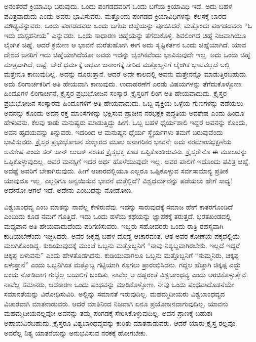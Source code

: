 ಅನಂತರವೆ ಕ್ರಿಯಾವಿಧಿ ಬರುವುದು. ಒಂದು ಪಂಗಡದವರಿಗೆ ಒಂದು ಬಗೆಯ ಕ್ರಿಯಾವಿಧಿ ಇದೆ. ಅದು ಬಹಳ ಪವಿತ್ರವಾದುದು ಎಂದು ಅವರು ಭಾವಿಸುವರು. ಮತ್ತೊಂದು ಪಂಗಡದ ಕ್ರಿಯಾವಿಧಿಗಳನ್ನು ಕೆಲಸಕ್ಕೆ ಬಾರದ ಮೌಢ್ಯವೆನ್ನುವರು. ಒಂದು ಪಂಗಡದವರು ಒಂದು ಬಗೆಯ ಚಿಹ್ನೆಯನ್ನು ಪೂಜಿಸಿದರೆ, ಮತ್ತೊಂದು ಪಂಗಡದವರು “ಓ ಇದು ದುಸ್ಸಹನೀಯ” ಎನ್ನುವರು. ಒಂದು ಸಾಧಾರಣ ಚಿಹ್ನೆಯನ್ನು ತೆಗೆದುಕೊಳ್ಳಿ. ಶಿವಲಿಂಗದ ಚಿಹ್ನೆ ನಿಜವಾಗಿಯೂ ಲೈಂಗಿಕ ಚಿಹ್ನೆ. ಆದರೆ ಕ್ರಮೇಣ ಆ ಭಾವನೆ ಮರೆತುಹೋಗಿ ಈಗ ಅದು ಸೃಷ್ಟಿಕರ್ತನ ಒಂದು ಚಿಹ್ನೆಯಾಗಿದೆ. ಯಾವ ದೇಶದ ಜನರಿಗೆ ಇದು ಚಿಹ್ನೆಯಾಗಿದೆಯೋ ಅವರು ಇದನ್ನು ಲೈಂಗಿಕವೆಂದು ಭಾವಿಸುವುದೇ ಇಲ್ಲ. ಅದು ಒಂದು ಚಿಹ್ನೆ ಮಾತ್ರವಾಗಿದೆ, ಅಷ್ಟೆ. ಬೇರೆ ಧರ್ಮಕ್ಕೆ ಅಥವಾ ಜನಾಂಗಕ್ಕೆ ಸೇರಿದ ಮತ್ತೊಬ್ಬನಿಗೆ ಲೈಂಗಿಕ ಭಾವವಲ್ಲದೆ ಅಲ್ಲಿ ಮತ್ತೇನೂ ಕಾಣುವುದಿಲ್ಲ. ಅದನ್ನು ದೂರುತ್ತಾನೆ. ಆದರೆ ಅದೇ ಕಾಲದಲ್ಲಿ ಅವನು ಮತ್ತೇನನ್ನೊ ಮಾಡುತ್ತಿರಬಹುದು. ಅದು ಲಿಂಗಾರ್ಚಕರಿಗೆ ಅತಿ ಹೇಯವಾಗಿ ಕಾಣುವುದು. ಉದಾಹರಣೆಗೆ ಎರಡು ವಿಷಯಗಳನ್ನು ತೆಗೆದುಕೊಳ್ಳೋಣ: ಹಿಂದೂಗಳ ಲಿಂಗಾರ್ಚನೆ, ಕ್ರೈಸ್ತರ ಪ್ರಭುಭೋಜನ ಸಂಸ್ಕಾರ. ಕ್ರೈಸ್ತರಿಗೆ ಲಿಂಗ ಅತಿ ಹೇಯವಾದುದು. ಕ್ರೈಸ್ತರ ಪ್ರಭುಭೋಜನ ಸಂಸ್ಕಾರವು ಹಿಂದೂಗಳಿಗೆ ಅತಿ ಹೇಯವಾದುದು. ಒಬ್ಬ ವ್ಯಕ್ತಿಯ ಒಳ್ಳೆಯ ಗುಣಗಳನ್ನು ಪಡೆಯಲು ಅವನನ್ನು ಕೊಂದು ಅವನ ರಕ್ತ ಮಾಂಸಗಳನ್ನು ಭಕ್ಷಿಸುವ ಪ್ರಾಚೀನ ನರಭಕ್ಷಕ ಪದ್ಧತಿಯ ಅವಶೇಷ ಎಂದು ಹಿಂದೂ ಹೇಳುವನು. ಕೆಲವು ಕಾಡು ಮನುಷ್ಯರು ಮಾಡುತ್ತಿದ್ದು ಹೀಗೆ. ಒಬ್ಬ ಬಹಳ ಧೈರ್ಯಶಾಲಿ ಇದ್ದರೆ ಅವನನ್ನು ಕೊಂದು, ಅವನ ಹೃದಯವನ್ನು ತಿನ್ನುವರು. ಇದರಿಂದ ಆ ಮನುಷ್ಯನ ಧೈರ್ಯ ಸ್ಥೈರ್ಯಗಳು ತಮಗೆ ಬರುವುವೆಂದು ಭಾವಿಸುವರು. ಕ್ರೈಸ್ತರ ಪ್ರಭುಭೋಜನ ಸಂಸ್ಕಾರದ ಮೂಲ ಅನಾಗರಿಕರ ಭಾವನೆ; ಅದು ನರಮಾಂಸಭಕ್ಷಣೆಯ ಅವಶೇಷ ಎಂದು ಸರ್​ ಜಾನ್​ ಲುಬಕ್​ ನಂತಹ ಕ್ರೈಸ್ತಭಕ್ತ ಕೂಡ ಒಪ್ಪಿಕೊಂಡಿರುವನು. ಕ್ರೈಸ್ತರೇನೊ ಈ ಮೂಲವನ್ನು ಒಪ್ಪಿಕೊಳ್ಳುವುದಿಲ್ಲ. ಅವರ ಮನಸ್ಸಿಗೆ ಇದರ ಅರ್ಥ ಹೊಳೆಯುವುದೇ ಇಲ್ಲ. ಅವರ ಪಾಲಿಗೆ ಇದೊಂದು ಪವಿತ್ರ ಚಿಹ್ನೆ. ಅದಷ್ಟೆ ಅವರಿಗೆ ಬೇಕಾಗಿರುವುದು. ಹೀಗೆ ಆಚಾರದಲ್ಲಿಯೂ ಎಲ್ಲರೂ ಒಪ್ಪಿಕೊಳ್ಳುವ ಸರ್ವಸಾಮಾನ್ಯ ಪ್ರತೀಕ ಯಾವುದೂ ಇಲ್ಲ. ಎಲ್ಲರಿಗೂ ಅನ್ವಯಿಸುವ ಭಾವನೆ ಮತ್ತೆಲ್ಲಿದೆ? ವಿಶ್ವಧರ್ಮವನ್ನು ಪಡೆಯಲು ಹೇಗೆ ಸಾಧ್ಯ! ಅದೇನೋ ಆಗಲೆ ಇದೆ. ಅದೇನು ಎಂಬುದನ್ನು ನೋಡೋಣ.

ವಿಶ್ವಬಾಂಧವ್ಯ ಎಂಬ ಮಾತನ್ನು ನಾವೆಲ್ಲ ಕೇಳಿರುವೆವು. ಇದನ್ನು ಸಾರುವುದಕ್ಕೆ ಸಮಾಜ ಹೇಗೆ ಕಾತರಗೊಂಡಿದೆ ಎಂಬುದು ಕೂಡ ನಮಗೆ ಗೊತ್ತಿದೆ. ಇದು ಒಂದು ಹಳೆಯ ಕಥೆಯನ್ನು ಜ್ಞಾಪಕಕ್ಕೆ ತರುತ್ತದೆ. ಭರತಖಂಡದಲ್ಲಿ ಮದ್ಯಪಾನ ಅತಿ ಹೇಯವಾದುದೆಂದು ಪರಿಗಣಿಸುವರು. ಇಬ್ಬರು ಸಹೋದರರು ಒಂದು ರಾತ್ರಿ ರಹಸ್ಯವಾಗಿ ಕುಡಿಯಬೇಕೆಂದು ಇಚ್ಛಿಸಿದರು. ಅವರ ಚಿಕ್ಕಪ್ಪ ಬಹಳ ದೊಡ್ಡ ಆಚಾರವಂತ. ಆತ ಅವರ ಕೋಣೆಯ ಪಕ್ಕದಲ್ಲಿಯೆ ಮಲಗಿಕೊಂಡಿದ್ದ. ಕುಡಿಯುವುದಕ್ಕೆ ಮುಂಚೆ ಒಬ್ಬನು ಮತ್ತೊಬ್ಬನಿಗೆ “ನಾವು ನಿಶ್ಯಬ್ದವಾಗಿರಬೇಕು. ಇಲ್ಲದೆ ಇದ್ದರೆ ಚಿಕ್ಕಪ್ಪ ಏಳುವನು” ಎಂದು ಹೇಳತೊಡಗಿದನು. ಕುಡಿಯುವಾಗಲೂ ಒಬ್ಬನು ಮತ್ತೊಬ್ಬನಿಗೆ “ಸುಮ್ಮನಿರು, ಚಿಕ್ಕಪ್ಪ ಏಳುತ್ತಾನೆ” ಎಂದು ಒಬ್ಬನಿಗಿಂತ ಮತ್ತೊಬ್ಬ ಗಟ್ಟಿಯಾಗಿ ಕೂಗಲು ಪ್ರಾರಂಭಿಸಿದನು. ಗದ್ದಲ ಹೆಚ್ಚಾಗಿ ಚಿಕ್ಕಪ್ಪ ಎದ್ದು ಬಂದು ನೋಡಿದಾಗ ಗುಟ್ಟೆಲ್ಲ ಬಯಲಿಗೆ ಬಂದಿತು. ನಾವೆಲ್ಲ ಆ ದಡ್ಡರಂತೆ ವಿಶ್ವಬಾಂಧವ್ಯ ಎಂದು ಅರಚಿಕೊಳ್ಳುತ್ತೇವೆ. ನಾವೆಲ್ಲ ಸಮಾನರು, ಆದಕಾರಣ ಒಂದು ಪಂಥವನ್ನು ಮಾಡಿಕೊಳ್ಳೋಣ. ನೀವು ಒಂದು ಪಂಥವಾದೊಡನೆಯೇ ಸಮಾನತೆಯನ್ನು ವಿರೋಧಿಸುವಿರಿ. ಅಲ್ಲಿನ್ನು ಸಮಾನತೆ ಇರುವುದಿಲ್ಲ. ಮಹಮ್ಮದೀಯರು ವಿಶ್ವಬಾಂಧವ್ಯದ ವಿಚಾರವಾಗಿ ಮಾತನಾಡುವರು. ಆದರೆ ಮಾತಿನಿಂದ ನಿಜವಾಗಿ ಏನೂ ಪ್ರಯೋಜನವಾಗುವುದಿಲ್ಲ. ಯಾವನು ಮಹಮ್ಮದೀಯನಲ್ಲವೋ ಅವನನ್ನು ತಮ್ಮ ಪಂಗಡಕ್ಕೆ ಸೇರಿಸಿಕೊಳ್ಳುವುದಿಲ್ಲ. ಅವನ ಪ್ರಾಣಕ್ಕೆ ಬಹುಶಃ ಅಪಾಯವಿರಬಹುದು. ಕ್ರೈಸ್ತರೂ ವಿಶ್ವಬಾಂಧವ್ಯವನ್ನು ಕುರಿತು ಮಾತನಾಡುವರು. ಆದರೆ ಯಾರು ಕ್ರೈಸ್ತ ರಲ್ಲವೊ ಅವರೆಲ್ಲ ನಿತ್ಯ ಯಾತನೆಯನ್ನು ಅನುಭವಿಸುವ ನರಕಕ್ಕೆ ಹೋಗಬೇಕು.

